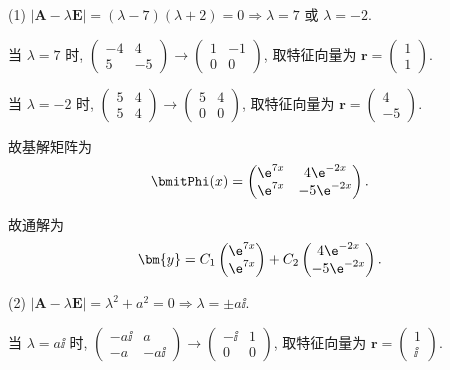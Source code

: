 \begin{solve}
  (1) $|\bm{A}-\lambda\bm{E}|=(\lambda-7)(\lambda+2)=0\Rightarrow\lambda=7$ 或 $\lambda=-2$.

  当 $\lambda=7$ 时, $\begin{pmatrix}-4&4\\5&-5\end{pmatrix}\to\begin{pmatrix}1&-1\\0&0\end{pmatrix}$, 
  取特征向量为 $\bm{r}=\begin{pmatrix}1\\1\end{pmatrix}$.

  当 $\lambda=-2$ 时, $\begin{pmatrix}5&4\\5&4\end{pmatrix}\to\begin{pmatrix}5&4\\0&0\end{pmatrix}$, 
  取特征向量为 $\bm{r}=\begin{pmatrix}4\\-5\end{pmatrix}$.

  故基解矩阵为
  \[\bmitPhi(x)=\begin{pmatrix}\e^{7x}&4\e^{-2x}\\\e^{7x}&-5\e^{-2x}\end{pmatrix}.\]

  故通解为
  \[\bm{y}=C_1\begin{pmatrix}\e^{7x}\\\e^{7x}\end{pmatrix}
    + C_2\begin{pmatrix}4\e^{-2x}\\-5\e^{-2x}\end{pmatrix}.\]

  (2) $|\bm{A}-\lambda\bm{E}|=\lambda^2+a^2=0\Rightarrow\lambda=\pm a\ii$.

  当 $\lambda=a\ii$ 时, $\begin{pmatrix}-a\ii&a\\-a&-a\ii\end{pmatrix}\to\begin{pmatrix}-\ii&1\\0&0\end{pmatrix}$,
  取特征向量为 $\bm{r}=\begin{pmatrix}1\\\ii\end{pmatrix}$.


\end{solve}
